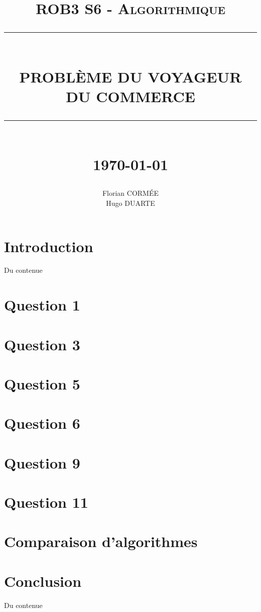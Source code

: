 \documentclass[12pt]{report}
\newcommand{\HRule}[1]{\rule{\linewidth}{#1}}
\begin{document}
\title{
	    \normalsize \textsc{ROB3 S6 - Algorithmique}
		\\ [1.0cm]
		\HRule{0.5pt} \\
		\LARGE \textbf{\uppercase{Problème du voyageur\\du commerce}}
		\HRule{2pt} \\ [0.5cm]
		\normalsize \today{} \vspace*{5\baselineskip}}
\date{}
\author{
		Florian CORMÉE \\
		Hugo DUARTE}
\maketitle
\tableofcontents
\newpage

\section*{Introduction}

Du contenue

\section*{Question 1}


\section*{Question 3}


\section*{Question 5}


\section*{Question 6}


\section*{Question 9}


\section*{Question 11}


\newpage
\section*{Comparaison d'algorithmes}


\section*{Conclusion}

Du contenue
\end{document}
